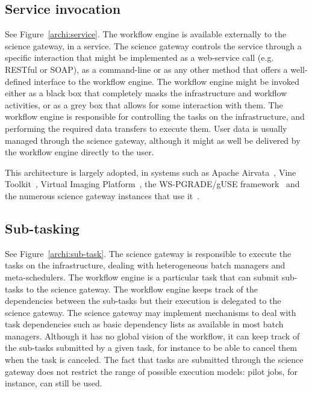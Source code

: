 \documentclass[preprint,3p,twocolumn]{elsarticle}
\begin{document}
\subsection{Service invocation}

See Figure~\ref{archi:service}. The workflow engine is available
externally to the science gateway, in a service. The science gateway
controls the service through a specific interaction that might be
implemented as a web-service call (e.g. RESTful or SOAP), as a
command-line or as any other method that offers a well-defined
interface to the workflow engine. The workflow engine might be invoked
either as a black box that completely masks the infrastructure and
workflow activities, or as a grey box that allows for some interaction
with them.  The workflow engine is responsible for controlling the
tasks on the infrastructure, and performing the required data
transfers to execute them. User data is usually managed through the
science gateway, although it might as well be delivered by the
workflow engine directly to the user.

This architecture is largely adopted, in systems such as Apache
Airvata~\cite{marru2011apache}, Vine
Toolkit~\cite{DBLP:journals/scpe/SzejnfeldDKKKKLPTWDNW10}, Virtual
Imaging Platform~\cite{GLAT-13}, the WS-PGRADE/gUSE
framework~\cite{Kacsuk2012} and the numerous science gateway instances
that use it~\cite{kacsuk2014science}.

\subsection{Sub-tasking}

See Figure~\ref{archi:sub-task}. The science gateway is responsible to
execute the tasks on the infrastructure, dealing with heterogeneous
batch managers and meta-schedulers. The workflow engine is a
particular task that can submit sub-tasks to the science gateway. The
workflow engine keeps track of the dependencies between the sub-tasks
but their execution is delegated to the science gateway. The science
gateway may implement mechanisms to deal with task dependencies such
as basic dependency lists as available in most batch
managers. Although it has no global vision of the workflow, it can
keep track of the sub-tasks submitted by a given task, for instance to
be able to cancel them when the task is canceled. The fact that tasks
are submitted through the science gateway does not restrict the range
of possible execution models: pilot jobs, for instance, can still be
used.
\end{document}

